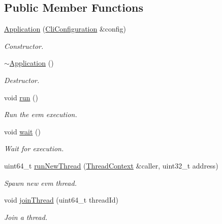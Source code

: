 \subsection*{Public Member Functions}
\begin{DoxyCompactItemize}
\item 
\mbox{\hyperlink{struct_evm_1_1_application_ac0dcf0cf2c0b1b3e70024a07536534a2}{Application}} (\mbox{\hyperlink{struct_evm_1_1_cli_configuration}{Cli\+Configuration}} \&config)
\begin{DoxyCompactList}\small\item\em Constructor. \end{DoxyCompactList}\item 
\mbox{\label{struct_evm_1_1_application_ab209f49ad8c73c1f3fde7c66585284fb}} 
\mbox{\hyperlink{struct_evm_1_1_application_ab209f49ad8c73c1f3fde7c66585284fb}{$\sim$\+Application}} ()
\begin{DoxyCompactList}\small\item\em Destructor. \end{DoxyCompactList}\item 
void \mbox{\hyperlink{struct_evm_1_1_application_a26403ae00f2a6d2ef5fa3e78e183f4ce}{run}} ()
\begin{DoxyCompactList}\small\item\em Run the evm execution. \end{DoxyCompactList}\item 
void \mbox{\hyperlink{struct_evm_1_1_application_a17e8baa475b18f35f70823a91f12304c}{wait}} ()
\begin{DoxyCompactList}\small\item\em Wait for execution. \end{DoxyCompactList}\item 
uint64\+\_\+t \mbox{\hyperlink{struct_evm_1_1_application_a4b5883ca11f132aa33ede5a2acd997cc}{run\+New\+Thread}} (\mbox{\hyperlink{struct_evm_1_1_thread_context}{Thread\+Context}} \&caller, uint32\+\_\+t address)
\begin{DoxyCompactList}\small\item\em Spawn new evm thread. \end{DoxyCompactList}\item 
void \mbox{\hyperlink{struct_evm_1_1_application_a71ad6065512bd28e0208fee37597484b}{join\+Thread}} (uint64\+\_\+t thread\+Id)
\begin{DoxyCompactList}\small\item\em Join a thread. \end{DoxyCompactList}\item 

\end{DoxyCompactItemize}

